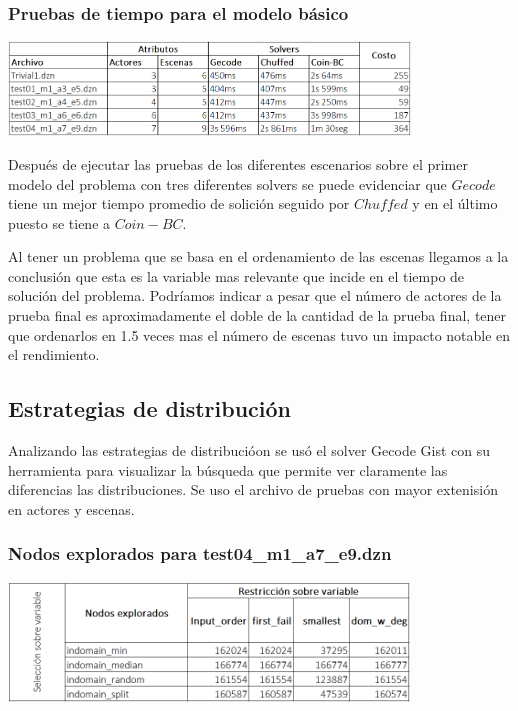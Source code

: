 \documentclass{article}
\begin{document}
\subsubsection{Pruebas de tiempo para el modelo básico}
\begin{center}
    \includegraphics[width=0.8\textwidth]{img/pruebasModelo1.png}
\end{center}
Después de ejecutar las pruebas de los diferentes escenarios sobre el primer modelo del problema con tres diferentes solvers se puede evidenciar que $Gecode$ tiene un mejor tiempo promedio de solición seguido por $Chuffed$ y en el último puesto se tiene a $Coin-BC$. \newline\newline

Al tener un problema que se basa en el ordenamiento de las escenas llegamos a la conclusión que esta es la variable mas relevante que incide en el tiempo de solución del problema. Podríamos indicar a pesar que el número de actores de la prueba final es aproximadamente el doble de la cantidad de la prueba final, tener que ordenarlos en 1.5 veces mas el número de escenas tuvo un impacto notable en el rendimiento.

\subsection{Estrategias de distribución}
Analizando las estrategias de distribucióon se usó el solver Gecode Gist con su herramienta para visualizar la búsqueda que permite ver claramente las diferencias las distribuciones. Se uso el archivo de pruebas con mayor extenisión en actores y escenas.
\subsubsection{Nodos explorados para test04_m1_a7_e9.dzn}
\begin{center}
    \includegraphics[width=0.80\textwidth]{img/estrategiasDeDistribucion.png}
\end{center}
\end{document}
